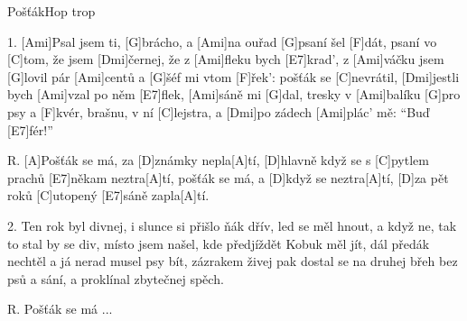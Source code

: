 \begin{song}{Pošťák}{Hop trop}

\begin{xverse}{1. }
[Ami]Psal jsem ti, [G]brácho, a [Ami]na ouřad [G]psaní šel [F]dát,
psaní vo [C]tom, že jsem [Dmi]{čer}nej, že z [Ami]fleku bych [E7]krad',
z [Ami]váčku jsem [G]lovil pár [Ami]centů a [G]{šéf} mi vtom [F]{řek':}
pošťák se [C]nevrátil, [Dmi]jestli bych [Ami]vzal po něm [E7]flek,
[Ami]sáně mi [G]dal, tresky v [Ami]balíku [G]pro psy a [F]kvér,
brašnu, v ní [C]lejstra, a [Dmi]po zádech [Ami]plác' mě: ``Buď [E7]fér!''
\end{xverse}

\begin{xverse}{R. }
[A]Pošťák se má, za [D]známky nepla[A]tí,
[D]hlavně když se s [C]pytlem prachů [E7]někam neztra[A]tí,
pošťák se má, a [D]když se neztra[A]tí,
[D]za pět roků [C]utopený [E7]sáně zapla[A]tí.
\end{xverse}

\begin{xverse}{2. }
Ten rok byl divnej, i slunce si přišlo ňák dřív,
led se měl hnout, a když ne, tak to stal by se div,
místo jsem našel, kde předjíždět Kobuk měl jít,
dál předák nechtěl a já nerad musel psy bít,
zázrakem živej pak dostal se na druhej břeh
bez psů a sání, a proklínal zbytečnej spěch.
\end{xverse}

\begin{xverse}{R. }
Pošťák se má ...
\end{xverse}

\end{song}

%
%
%
%
%

